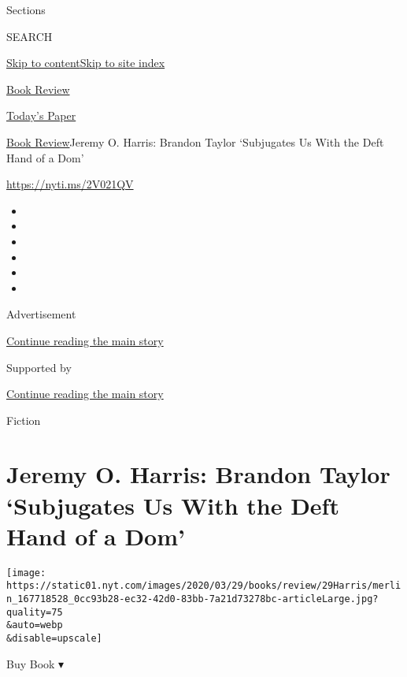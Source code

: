 Sections

SEARCH

\protect\hyperlink{site-content}{Skip to
content}\protect\hyperlink{site-index}{Skip to site index}

\href{https://www.nytimes.com/section/books/review}{Book Review}

\href{https://myaccount.nytimes.com/auth/login?response_type=cookie\&client_id=vi}{}

\href{https://www.nytimes.com/section/todayspaper}{Today's Paper}

\href{/section/books/review}{Book Review}\textbar{}Jeremy O. Harris:
Brandon Taylor `Subjugates Us With the Deft Hand of a Dom'

\url{https://nyti.ms/2V021QV}

\begin{itemize}
\item
\item
\item
\item
\item
\item
\end{itemize}

Advertisement

\protect\hyperlink{after-top}{Continue reading the main story}

Supported by

\protect\hyperlink{after-sponsor}{Continue reading the main story}

Fiction

\hypertarget{jeremy-o-harris-brandon-taylor-subjugates-us-with-the-deft-hand-of-a-dom}{%
\section{Jeremy O. Harris: Brandon Taylor `Subjugates Us With the Deft
Hand of a
Dom'}\label{jeremy-o-harris-brandon-taylor-subjugates-us-with-the-deft-hand-of-a-dom}}

\texttt{[image: https://static01.nyt.com/images/2020/03/29/books/review/29Harris/merlin\_167718528\_0cc93b28-ec32-42d0-83bb-7a21d73278bc-articleLarge.jpg?quality=75\\\&auto=webp\\\&disable=upscale]}

Buy Book ▾

